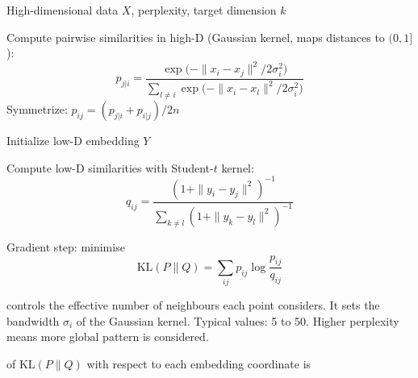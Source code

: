 \begin{algorithm}[H]
\begin{algorithmic}[1]
\Require High-dimensional data $X$, perplexity, target dimension $k$

\State Compute pairwise similarities in high-D (Gaussian kernel, maps distances to $(0,1]$):
\[
  p_{j|i} = \frac{\exp\!\bigl(-\|x_i - x_j\|^2 / 2\sigma_i^2\bigr)}
                  {\sum_{l \neq i} \exp\!\bigl(-\|x_i - x_l\|^2 / 2\sigma_i^2\bigr)}
\]
Symmetrize: $p_{ij} = (p_{j|i} + p_{i|j}) / 2n$

\State Initialize low-D embedding $Y$

\Repeat

    \State Compute low-D similarities with Student-$t$ kernel:
    \[
      q_{ij} = \frac{(1 + \|y_i - y_j\|^2)^{-1}}
                    {\sum_{k \neq l} (1 + \|y_k - y_l\|^2)^{-1}}
    \]

    \State Gradient step: minimise
    \[
      \text{KL}(P \| Q) = \sum_{ij} p_{ij} \log \frac{p_{ij}}{q_{ij}}
    \]

\end{algorithmic}
\caption{t-SNE. All points are updated simultaneously (batch gradient descent). 
The KL objective is non-convex, so there is no convergence guarantee; different 
random initialisations can yield different layouts.}
\end{algorithm}


 controls the effective number of neighbours each point considers.
It sets the bandwidth $\sigma_i$ of the Gaussian kernel.
Typical values: 5 to 50.
Higher perplexity means more global pattern is considered.



 of $\text{KL}(P \| Q)$ with respect to each embedding coordinate is

